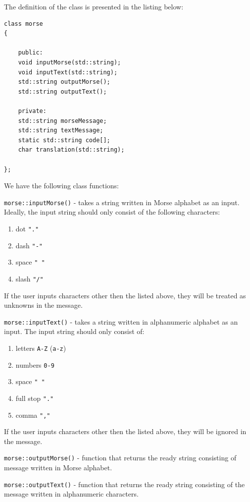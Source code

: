 \documentclass[12pt]{report}
\begin{document}
The definition of the class is presented in the listing below:

\begin{lstlisting}
class morse
{

	public:
	void inputMorse(std::string);
	void inputText(std::string);
	std::string outputMorse();
	std::string outputText();

	private:
	std::string morseMessage;
	std::string textMessage;
	static std::string code[];
	char translation(std::string);

};
\end{lstlisting}


We have the following class functions:

\verb|morse::inputMorse()| - takes a string written in Morse alphabet as an input. Ideally, the input string should only consist of the following characters:

\begin{enumerate}
\item dot \verb|"."|

\item dash \verb|"-"|

\item space \verb|" "|

\item slash \verb|"/"|
\end{enumerate}

If the user inputs characters other then the listed above, they will be treated as unknowns in the message.


\verb|morse::inputText()| - takes a string written in alphanumeric alphabet as an input. The input string should only consist of:

\begin{enumerate}
\item letters \verb|A-Z| (\verb|a-z|)
\item numbers \verb|0-9|
\item space \verb|" "|
\item full stop \verb|"."|
\item comma \verb|","|
\end{enumerate}

If the user inputs characters other then the listed above, they will be ignored in the message.

\verb|morse::outputMorse()| - function that returns the ready string consisting of message written in Morse alphabet.

\verb|morse::outputText()| - function that returns the ready string consisting of the message written in alphanumeric characters.
\end{document}
